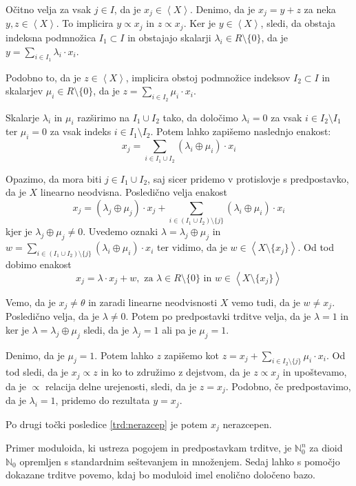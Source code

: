 \documentclass[mat1]{fmfdelo}
\newcommand{\N}{\mathbb{N}}
\newcommand{\No}{\N_0}
\newcommand{\Gen}[1]{\ensuremath{\left<{#1}\right>}}
\begin{document}
\begin{dokaz}
	Očitno velja za vsak $j\in I$, da je $x_j\in\Gen{X}$. Denimo, da je $x_j = y + z$ za neka $y, z\in\Gen{X}$. To implicira $y\varpropto x_j$ in $z\varpropto x_j$. 
	Ker je $y\in\Gen{X}$, sledi, da obstaja indeksna podmnožica $I_1 \subset I$ in obstajajo skalarji $\lambda_i\in R\setminus\{0\}$, da je $y = \sum_{i \in I_1}\lambda_i\cdot x_i$. 
	
	Podobno to, da je $z\in\Gen{X}$, implicira obstoj podmnožice indeksov $I_2\subset I$ in skalarjev $\mu_i\in R\setminus\{0\}$, da je $z = \sum_{i\in I_2}\mu_i\cdot x_i$. 
	
	Skalarje $\lambda_i$ in $\mu_i$ razširimo na $I_1\cup I_2$ tako, da določimo $\lambda_i = 0$ za vsak $i\in I_2\setminus I_1$ ter $\mu_i = 0$ za vsak indeks $i\in I_1\setminus I_2$. Potem lahko zapišemo naslednjo enakost: $$x_j = \sum_{i\in I_1\cup I_2}(\lambda_i \oplus\mu_i)\cdot x_i$$
	
	Opazimo, da mora biti $j\in I_1\cup I_2$, saj sicer pridemo v protislovje s predpostavko, da je $X$ linearno neodvisna. Posledično velja enakost $$ x_j = (\lambda_j\oplus\mu_j)\cdot x_j + \sum_{i\in (I_1\cup I_2)\setminus\{j\}}(\lambda_i\oplus\mu_i)\cdot x_i $$
	kjer je $\lambda_j\oplus\mu_j\neq 0$. Uvedemo oznaki $\lambda = \lambda_j\oplus\mu_j$ in $w = \sum_{i\in (I_1\cup I_2)\setminus\{j\}}(\lambda_i\oplus\mu_i)\cdot x_i$ ter vidimo, da je $w\in\Gen{X\setminus\{x_j\}}$. Od tod dobimo enakost $$x_j = \lambda\cdot x_j + w,\text{~za~} \lambda\in R\setminus\{0\}\text{~in~} w\in\Gen{X\setminus\{x_j\}} $$
	
	Vemo, da je $x_j\neq \theta$ in zaradi linearne neodvisnosti $X$ vemo tudi, da je $w\neq x_j$. Posledično velja, da je $\lambda\neq 0$. Potem po predpostavki trditve velja, da je $\lambda = 1$ in ker je $\lambda = \lambda_j\oplus\mu_j$ sledi, da je $\lambda_j = 1$ ali pa je $\mu_j = 1$. 
	
	Denimo, da je $\mu_j = 1$. Potem lahko $z$ zapišemo kot $z = x_j + \sum_{i\in I_2\setminus\{j\}}\mu_i\cdot x_i$. Od tod sledi, da je $x_j\varpropto z$ in ko to združimo z dejstvom, da je $z \varpropto x_j$ in upoštevamo, da je $\varpropto$ relacija delne urejenosti, sledi, da je $z = x_j$. Podobno, če predpostavimo, da je $\lambda_i = 1$, pridemo do rezultata $y = x_j$.
	
	Po drugi točki posledice \ref{trd:nerazcep} je potem $x_j$ nerazcepen.
\end{dokaz}
Primer moduloida, ki ustreza pogojem in predpostavkam trditve, je $\No^n$ za dioid $\No$ opremljen s standardnim seštevanjem in množenjem.
Sedaj lahko s pomočjo dokazane trditve povemo, kdaj bo moduloid imel enolično določeno bazo.
\end{document}
